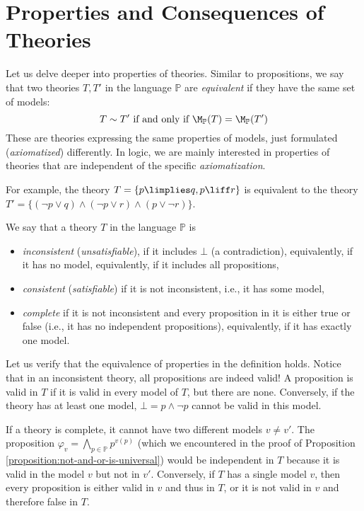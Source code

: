 \section{Properties and Consequences of Theories}

Let us delve deeper into properties of theories. Similar to propositions, we say that two theories $T, T'$ in the language $\mathbb P$ are \emph{equivalent} if they have the same set of models:
$$
T \sim T' \text{ if and only if } \M_\mathbb P(T) = \M_\mathbb P(T')
$$
These are theories expressing the same properties of models, just formulated (\emph{axiomatized}) differently. In logic, we are mainly interested in properties of theories that are independent of the specific \emph{axiomatization}.

\begin{example}
    For example, the theory $T = \{p \limplies q, p \liff r\}$ is equivalent to the theory $T' = \{(\neg p \lor q) \land (\neg p \lor r) \land (p \lor \neg r)\}$.
\end{example}

\begin{definition}
We say that a theory $T$ in the language $\mathbb P$ is
\begin{itemize}
    \item \emph{inconsistent} (\emph{unsatisfiable}), if it includes $\bot$ (a contradiction), equivalently, if it has no model, equivalently, if it includes all propositions,
    \item \emph{consistent} (\emph{satisfiable}) if it is not inconsistent, i.e., it has some model,
    \item \emph{complete} if it is not inconsistent and every proposition in it is either true or false (i.e., it has no independent propositions), equivalently, if it has exactly one model.
\end{itemize}    
\end{definition}

Let us verify that the equivalence of properties in the definition holds. Notice that in an inconsistent theory, all propositions are indeed valid! A proposition is valid in $T$ if it is valid in every model of $T$, but there are none. Conversely, if the theory has at least one model, $\bot = p \land \neg p$ cannot be valid in this model.

If a theory is complete, it cannot have two different models $v \neq v'$. The proposition $\varphi_{v} = \bigwedge_{p \in \mathbb P} p^{v(p)}$ (which we encountered in the proof of Proposition \ref{proposition:not-and-or-is-universal}) would be independent in $T$ because it is valid in the model $v$ but not in $v'$. Conversely, if $T$ has a single model $v$, then every proposition is either valid in $v$ and thus in $T$, or it is not valid in $v$ and therefore false in $T$.

